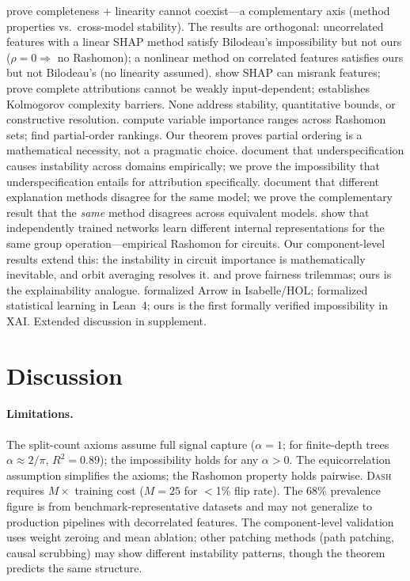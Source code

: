 \documentclass{article}
\newcommand{\DASH}{\textsc{Dash}}
\begin{document}
\citet{bilodeau2024impossibility} prove completeness + linearity cannot coexist---a complementary axis (method properties vs.\ cross-model stability). The results are orthogonal: uncorrelated features with a linear SHAP method satisfy Bilodeau's impossibility but not ours ($\rho = 0 \Rightarrow$ no Rashomon); a nonlinear method on correlated features satisfies ours but not Bilodeau's (no linearity assumed). \citet{huang2024failings} show SHAP can misrank features; \citet{srinivas2019full} prove complete attributions cannot be weakly input-dependent; \citet{rao2025limits} establishes Kolmogorov complexity barriers. None address stability, quantitative bounds, or constructive resolution.
\citet{fisher2019models} compute variable importance ranges across Rashomon sets; \citet{laberge2023partial} find partial-order rankings. Our theorem proves partial ordering is a mathematical necessity, not a pragmatic choice.
\citet{damour2022underspecification} document that underspecification causes instability across domains empirically; we prove the impossibility that underspecification entails for attribution specifically.
\citet{krishna2022disagreement} document that different explanation methods disagree for the same model; we prove the complementary result that the \emph{same} method disagrees across equivalent models.
\citet{chughtai2023toy} show that independently trained networks learn different internal representations for the same group operation---empirical Rashomon for circuits. Our component-level results extend this: the instability in circuit importance is mathematically inevitable, and orbit averaging resolves it.
\citet{chouldechova2017fair} and \citet{kleinberg2017inherent} prove fairness trilemmas; ours is the explainability analogue.
\citet{nipkow2009social} formalized Arrow in Isabelle/HOL; \citet{zhang2026statistical} formalized statistical learning in Lean~4; ours is the first formally verified impossibility in XAI. Extended discussion in supplement.

\section{Discussion}
\label{sec:discussion}

\paragraph{Limitations.}
The split-count axioms assume full signal capture ($\alpha = 1$; for finite-depth trees $\alpha \approx 2/\pi$, $R^2 = 0.89$); the impossibility holds for any $\alpha > 0$.
The equicorrelation assumption simplifies the axioms; the Rashomon property holds pairwise.
\DASH{} requires $M \times$ training cost ($M = 25$ for $<$1\% flip rate).
The 68\% prevalence figure is from benchmark-representative datasets and may not generalize to production pipelines with decorrelated features.
The component-level validation uses weight zeroing and mean ablation; other patching methods (path patching, causal scrubbing) may show different instability patterns, though the theorem predicts the same structure.
\end{document}
